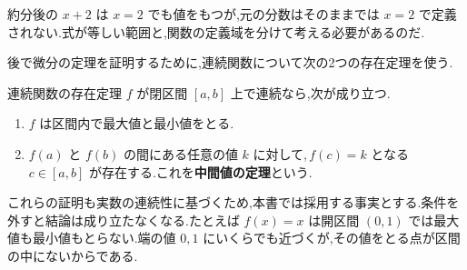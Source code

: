 約分後の $x+2$ は $x=2$ でも値をもつが,元の分数はそのままでは $x=2$ で定義されない.式が等しい範囲と,関数の定義域を分けて考える必要があるのだ.

後で微分の定理を証明するために,連続関数について次の2つの存在定理を使う.

\begin{theorem}{連続関数の存在定理}\label{定理:連続関数存在}
$f$ が閉区間 $[a,b]$ 上で連続なら,次が成り立つ.
\begin{enumerate}[label=(\arabic*),leftmargin=*]
 \item $f$ は区間内で最大値と最小値をとる.
 \item $f(a)$ と $f(b)$ の間にある任意の値 $k$ に対して,\,$f(c)=k$ となる $c\in[a,b]$ が存在する.これを\textbf{中間値の定理}という.
\end{enumerate}
\end{theorem}

これらの証明も実数の連続性に基づくため,本書では採用する事実とする.条件を外すと結論は成り立たなくなる.たとえば $f(x)=x$ は開区間 $(0,1)$ では最大値も最小値もとらない.端の値 $0,1$ にいくらでも近づくが,その値をとる点が区間の中にないからである.
